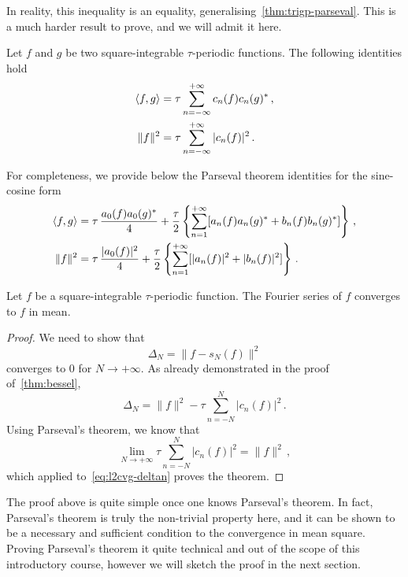 In reality, this inequality is an equality, generalising~\cref{thm:trigp-parseval}. This is a much harder result to prove, and we will admit it here.
\begin{theorem}[Parseval]
  \label{thm:parseval}
  Let $f$ and $g$ be two square-integrable $\tau$-periodic functions. The following identities hold
  \begin{align}
    \braket{f,g}&=\tau\sum_{n=-\infty}^{+\infty}c_n(f)c_n(g)^*\,,
    \label{eq:fs-dot}\\
    \|f\|^2&=\tau\sum_{n=-\infty}^{+\infty}|c_n(f)|^2\,.
    \label{eq:fs-norm}
  \end{align}
\end{theorem}
For completeness, we provide below the Parseval theorem identities for the sine-cosine form
\begin{align}
  \braket{f,g}&=\tau\,\frac{a_0(f)a_0(g)^*}{4}
  +\frac{\tau}{2}\left\{\sum_{n=1}^{+\infty}[a_n(f)a_n(g)^*+b_n(f)b_n(g)^*]\right\}\,,\\
  \|f\|^2&=\tau\,\frac{|a_0(f)|^2}{4}+\frac{\tau}{2}\left\{\sum_{n=1}^{+\infty}[|a_n(f)|^2+|b_n(f)|^2]\right\}\,.
\end{align}
\begin{theorem}
  Let $f$ be a square-integrable $\tau$-periodic function. The Fourier series of $f$
  converges to $f$ in mean.
\end{theorem}
\begin{proof}
  We need to show that
  \begin{equation}
    \Delta_N =\|f-s_N(f)\|^2
  \end{equation}
  converges to $0$ for $N\to+\infty$. As already demonstrated in the proof of~\cref{thm:bessel},
  \begin{equation}
    \Delta_N =\|f\|^2-\tau\sum_{n=-N}^{N}|c_n(f)|^2\,.\label{eq:l2cvg-deltan}
  \end{equation}
  Using Parseval's theorem, we know that
  \begin{equation}
    \lim_{N\to+\infty}\tau\sum_{n=-N}^{N}|c_n(f)|^2=\|f\|^2\,,
  \end{equation}
  which applied to~\cref{eq:l2cvg-deltan} proves the theorem.
\end{proof}
The proof above is quite simple once one knows Parseval's theorem. In fact, Parseval's theorem
is truly the non-trivial property here, and it can be shown to be a necessary and sufficient condition
to the convergence in mean square. Proving Parseval's theorem it quite technical and out of the scope of this introductory course, however we will sketch the proof in the next section.
